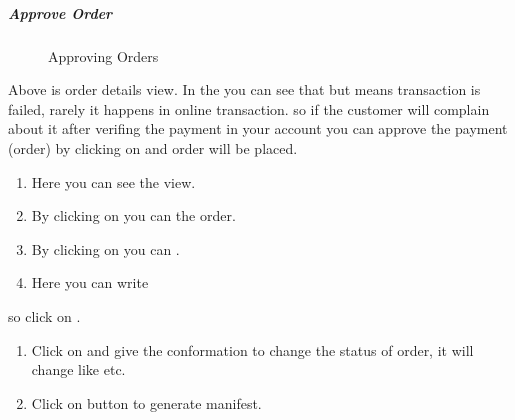 \documentclass[a4paper,10pt,english]{report}
\begin{document}
\subparagraph{Approve Order}
\label{\detokenize{orders:approve-order}}
\begin{figure}[htbp]
\centering
\capstart

\noindent{}
\caption{Approving Orders}\label{\detokenize{orders:id5}}\label{\detokenize{orders:id2}}\end{figure}

Above is order details view. In the  you can see that  but  means transaction is failed, rarely it happens in online transaction. so if the customer will complain about it after verifing the payment in your account you can approve the payment (order) by clicking on  and order will be placed.
\begin{enumerate}
\def\theenumi{\arabic{enumi}}
\def\labelenumi{\theenumi .}
\makeatletter\def\p@enumii{\p@enumi \theenumi .}\makeatother
\item {} 
Here you can see the  view.

\item {} 
By clicking on  you can  the order.

\item {} 
By clicking on  you can  .

\item {} 
Here you can write 

\end{enumerate}

so click on .
\begin{enumerate}
\def\theenumi{\arabic{enumi}}
\def\labelenumi{\theenumi .}
\makeatletter\def\p@enumii{\p@enumi \theenumi .}\makeatother
\setcounter{enumi}{4}
\item {} 
Click on  and give the conformation to change the status of order,  it will change like  etc.

\item {} 
Click on  button to generate manifest.

\end{enumerate}
\end{document}
